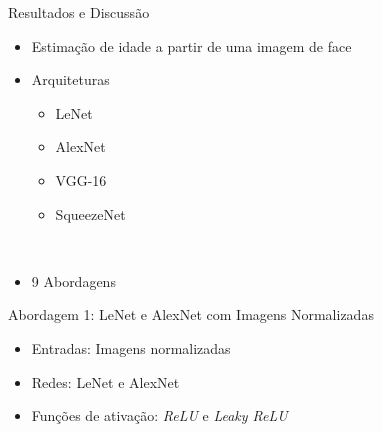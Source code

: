 
\begin{frame}{Resultados e Discussão}
 \begin{itemize}
   \item Estimação de idade a partir de uma imagem de face
   \ \ \newline
    \item Arquiteturas
    \begin{itemize}
      \item LeNet
      \item AlexNet
      \item VGG-16
      \item SqueezeNet
    \end{itemize}
   \ \ \newline
   \item \alert{9 Abordagens}
   \end{itemize}
\end{frame}


\begin{frame}{\large{Abordagem 1: LeNet e AlexNet com Imagens Normalizadas}}
 \begin{itemize}
   \item Entradas: Imagens normalizadas
   \item Redes: LeNet e AlexNet
   \item Funções de ativação: \emph{ReLU} e \emph{Leaky ReLU}
   \end{itemize}
\end{frame}

